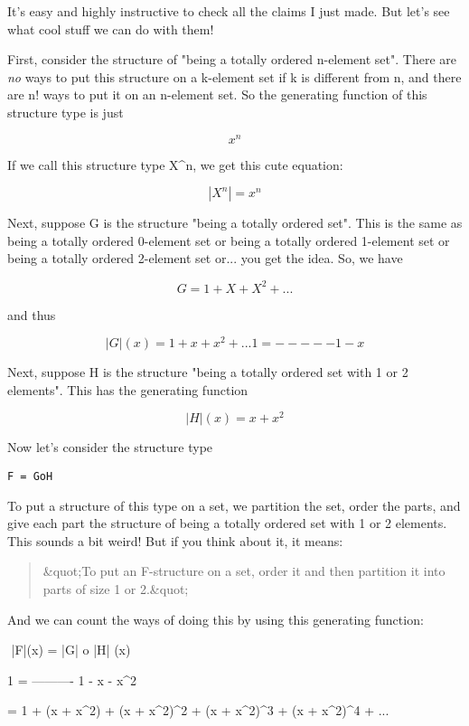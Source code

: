 It's easy and highly instructive to check all the claims I just made. 
But let's see what cool stuff we can do with them!   

First, consider the structure of "being a totally ordered n-element
set".  There are \emph{no} 
ways to put this structure on a k-element set if
k is different from n, and there are n! ways to put it on an n-element 
set.  So the generating function of this structure type is just

$$
x^{n}
$$
    
If we call this structure type X^{n}, we get this cute equation:

$$
|X^{n}| = x^{n}
$$
    
Next, suppose G is the structure "being a totally ordered set".  This 
is the same as being a totally ordered 0-element set or being a totally
ordered 1-element set or being a totally ordered 2-element set or... 
you get the idea.  So, we have

$$
     G = 1 + X + X^{2} + ...
$$
    
and thus

$$
|G|(x) = 1 + x + x^{2} + ...
 
           1
       = -----
         1 - x
$$
    
Next, suppose H is the structure "being a totally ordered set with 1 
or 2 elements".  This has the generating function

$$
|H|(x) = x + x^{2}
$$
    
Now let's consider the structure type

\begin{verbatim}
F = GoH
\end{verbatim}
    
To put a structure of this type on a set, we partition the set, order the
parts, and give each part the structure of being a totally ordered set
with 1 or 2 elements.  This sounds a bit weird!  But if you think about
it, it means:

\begin{quote}
      &quot;To put an F-structure on a set, order it and then partition
       it into parts of size 1 or 2.&quot;
\end{quote}
    
And we can count the ways of doing this by using this generating function:

$$
|F|(x)  = |G| o |H| (x)

              1
        = ----------
          1 - x - x^{2}

        = 1 + (x + x^{2}) + (x + x^{2})^{2} + (x + x^{2})^{3} + (x + x^{2})^{4} + ...

